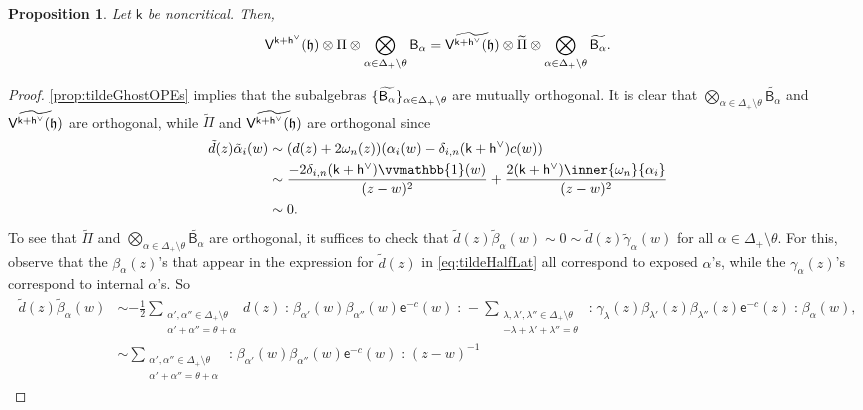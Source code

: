\documentclass[10pt,a4paper]{amsart}
\numberwithin{equation}{section}
\newcommand{\ee}{\mathsf{e}}   %
\newcommand{\kk}{\mathsf{k}}   %
\newcommand{\wun}{\vvmathbb{1}}  %
\DeclarePairedDelimiter{\brac}{\lparen}{\rparen}   %
\DeclarePairedDelimiter{\set}{\lbrace}{\rbrace}
\newcommand{\no}[1]{\mathopen{:} #1 \mathclose{:}} %
\newcommand{\VOA}[1]{\mathsf{#1}}    %
\newcommand{\cartan}{\mathfrak{h}}
\newcommand{\cox}{\mathsf{h}}                                        %
\newcommand{\dcox}{\coroot{\cox}}                                    %
\newcommand{\proots}{\Delta_+}                                       %
\newcommand{\sroot}[1]{\alpha_{#1}}                                  %
\newcommand{\tsroot}[1]{\tilde{\alpha}_{#1}}                         %
\newcommand{\hroot}{\theta}                                          %
\newcommand{\fwt}[1]{\omega_{#1}}                                    %
\newcommand{\coroot}[1]{#1^{\vee}}                                   %
\newcommand{\uaffvoa}[2]{\VOA{V}^{#1}\brac{#2}}                   %
\newcommand{\bgvoa}{\VOA{B}}                                      %
\theoremstyle{plain}
\newtheorem{proposition}[theorem]{Proposition}
\begin{document}
\begin{proposition} \label{prop:FreeFieldIso}
Let $\kk$ be noncritical. Then,
    \begin{equation}
    \uaffvoa{\kk+\dcox}{\cartan} \otimes \Pi  \otimes \bigotimes_{\alpha \in \proots \setminus \hroot} \bgvoa_\alpha= 
    \widetilde{\uaffvoa{\kk+\dcox}{\cartan}} \otimes \widetilde{\Pi} \otimes \bigotimes_{\alpha \in \proots \setminus \hroot} \widetilde{\bgvoa_\alpha}.
\end{equation}
\end{proposition}
\begin{proof}
\cref{prop:tildeGhostOPEs} implies that the subalgebras $\set{\widetilde{\bgvoa_\alpha}}_{\alpha \in \proots \setminus \hroot}$ are mutually orthogonal. It is clear that $ \bigotimes_{\alpha \in \proots \setminus \hroot} \widetilde{\bgvoa_\alpha}$ and $\widetilde{\uaffvoa{\kk+\dcox}{\cartan}}$ are orthogonal, while $\widetilde{\Pi}$ and $\widetilde{\uaffvoa{\kk+\dcox}{\cartan}}$ are orthogonal since
%
\begin{align}
    \tilde{d}(z)\tsroot{i}(w) &\sim (d(z) + 2 \fwt{n}(z))(\sroot{i}(w)-\delta_{i,n}(\kk+\dcox)c(w)) \\
    &\sim \frac{-2\delta_{i,n}(\kk+\dcox)\wun(w)}{(z-w)^2} + \frac{2(\kk+\dcox)\inner{\fwt{n}}{\sroot{i}}}{(z-w)^2} \notag \\
    &\sim 0.\notag 
\end{align}
%
To see that $\widetilde{\Pi}$ and $ \bigotimes_{\alpha \in \proots \setminus \hroot} \widetilde{\bgvoa_\alpha}$ are orthogonal, it suffices to check that $\tilde{d}(z) \tilde{\beta}_\alpha(w) \sim 0 \sim \tilde{d}(z) \tilde{\gamma}_\alpha(w)$ for all $\alpha \in \proots \setminus \hroot$. For this, observe that the $\beta_\alpha(z)$'s that appear in the expression for $\tilde{d}(z)$ in \eqref{eq:tildeHalfLat} all correspond to exposed $\alpha$'s, while the $\gamma_\alpha(z)$'s correspond to internal $\alpha$'s. So
%
\begin{align}
    \tilde{d}(z) \tilde{\beta}_\alpha(w) &\sim
    - \frac{1}{2}\sum_{\substack{\alpha',\alpha'' \in \proots \setminus \hroot \\ \alpha'+\alpha''=\hroot+\alpha}} d(z)\no{\beta_{\alpha'} (w) \beta_{\alpha''}(w)\ee^{-c}(w)}
    - \sum_{\substack{\lambda,\lambda',\lambda'' \in \proots \setminus \hroot \\ -\lambda+\lambda'+\lambda''=\hroot}} \no{\gamma_\lambda(z) \beta_{\lambda'} (z) \beta_{\lambda''}(z)\ee^{-c}(z)} \beta_\alpha(w), \\ &\sim
    \sum_{\substack{\alpha',\alpha'' \in \proots \setminus \hroot \\ \alpha'+\alpha''=\hroot+\alpha}} \no{\beta_{\alpha'} (w) \beta_{\alpha''}(w)\ee^{-c}(w)}(z-w)^{-1} 

\end{align}
\end{proof}
\end{document}
